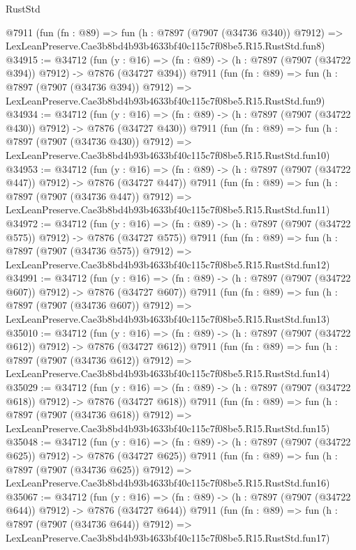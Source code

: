 \begin{lexlean}{RustStd}
\begin{coremodule}
    @7911
    (fun (fn : @89) =>
    fun (h : @7897 (@7907 (@34736 @340)) @7912) =>
    LexLeanPreserve.Cae3b8bd4b93b4633bf40c115c7f08be5.R15.RustStd.fun8)
@34915 := @34712
    (fun (y : @16) => (fn : @89) -> (h : @7897 (@7907 (@34722 @394)) @7912) -> @7876 (@34727 @394))
    @7911
    (fun (fn : @89) =>
    fun (h : @7897 (@7907 (@34736 @394)) @7912) =>
    LexLeanPreserve.Cae3b8bd4b93b4633bf40c115c7f08be5.R15.RustStd.fun9)
@34934 := @34712
    (fun (y : @16) => (fn : @89) -> (h : @7897 (@7907 (@34722 @430)) @7912) -> @7876 (@34727 @430))
    @7911
    (fun (fn : @89) =>
    fun (h : @7897 (@7907 (@34736 @430)) @7912) =>
    LexLeanPreserve.Cae3b8bd4b93b4633bf40c115c7f08be5.R15.RustStd.fun10)
@34953 := @34712
    (fun (y : @16) => (fn : @89) -> (h : @7897 (@7907 (@34722 @447)) @7912) -> @7876 (@34727 @447))
    @7911
    (fun (fn : @89) =>
    fun (h : @7897 (@7907 (@34736 @447)) @7912) =>
    LexLeanPreserve.Cae3b8bd4b93b4633bf40c115c7f08be5.R15.RustStd.fun11)
@34972 := @34712
    (fun (y : @16) => (fn : @89) -> (h : @7897 (@7907 (@34722 @575)) @7912) -> @7876 (@34727 @575))
    @7911
    (fun (fn : @89) =>
    fun (h : @7897 (@7907 (@34736 @575)) @7912) =>
    LexLeanPreserve.Cae3b8bd4b93b4633bf40c115c7f08be5.R15.RustStd.fun12)
@34991 := @34712
    (fun (y : @16) => (fn : @89) -> (h : @7897 (@7907 (@34722 @607)) @7912) -> @7876 (@34727 @607))
    @7911
    (fun (fn : @89) =>
    fun (h : @7897 (@7907 (@34736 @607)) @7912) =>
    LexLeanPreserve.Cae3b8bd4b93b4633bf40c115c7f08be5.R15.RustStd.fun13)
@35010 := @34712
    (fun (y : @16) => (fn : @89) -> (h : @7897 (@7907 (@34722 @612)) @7912) -> @7876 (@34727 @612))
    @7911
    (fun (fn : @89) =>
    fun (h : @7897 (@7907 (@34736 @612)) @7912) =>
    LexLeanPreserve.Cae3b8bd4b93b4633bf40c115c7f08be5.R15.RustStd.fun14)
@35029 := @34712
    (fun (y : @16) => (fn : @89) -> (h : @7897 (@7907 (@34722 @618)) @7912) -> @7876 (@34727 @618))
    @7911
    (fun (fn : @89) =>
    fun (h : @7897 (@7907 (@34736 @618)) @7912) =>
    LexLeanPreserve.Cae3b8bd4b93b4633bf40c115c7f08be5.R15.RustStd.fun15)
@35048 := @34712
    (fun (y : @16) => (fn : @89) -> (h : @7897 (@7907 (@34722 @625)) @7912) -> @7876 (@34727 @625))
    @7911
    (fun (fn : @89) =>
    fun (h : @7897 (@7907 (@34736 @625)) @7912) =>
    LexLeanPreserve.Cae3b8bd4b93b4633bf40c115c7f08be5.R15.RustStd.fun16)
@35067 := @34712
    (fun (y : @16) => (fn : @89) -> (h : @7897 (@7907 (@34722 @644)) @7912) -> @7876 (@34727 @644))
    @7911
    (fun (fn : @89) =>
    fun (h : @7897 (@7907 (@34736 @644)) @7912) =>
    LexLeanPreserve.Cae3b8bd4b93b4633bf40c115c7f08be5.R15.RustStd.fun17)

\end{coremodule}
\end{lexlean}
